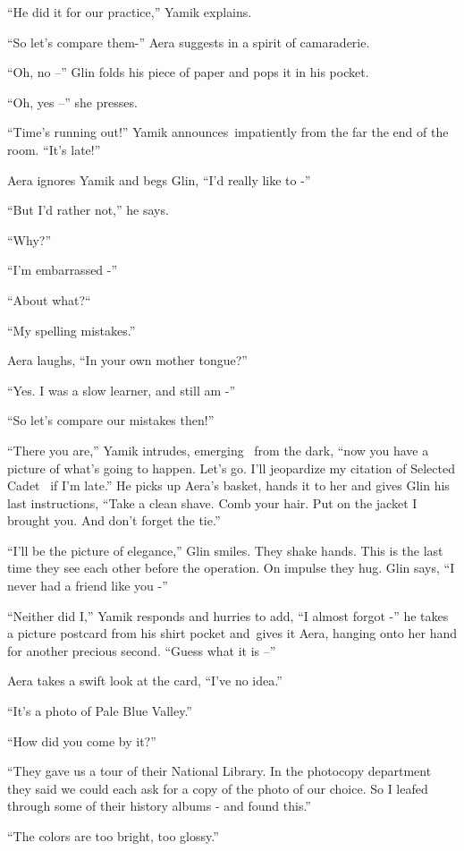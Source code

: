 \documentclass[twoside,11pt]{book}
\begin{document}
``He did it for our practice,'' Yamik explains.

``So let's compare them-'' Aera suggests in a spirit of camaraderie.

``Oh, no --'' Glin folds his piece of paper and pops it in his pocket.

``Oh, yes --'' she presses.

``Time's running out!'' Yamik announces~impatiently from the far the end of the room.
``It's late!''

Aera ignores Yamik and begs Glin, ``I'd really like to -''

``But I'd rather not,'' he says.

``Why?''

``I'm embarrassed -''

``About what?``~

``My spelling mistakes.''

Aera laughs, ``In your own mother tongue?''

``Yes. I was a slow learner, and still am -''

``So let's compare our mistakes then!''

{}``There you are,'' Yamik intrudes, emerging \ from the dark, ``now you have a picture of
what's going to happen. Let's go. I'll jeopardize my citation of Selected Cadet \ if I'm late.'' He picks
up Aera's basket, hands it to her and gives Glin his last instructions, ``Take a clean shave. Comb your
hair. Put on the jacket I brought you. And don't forget the tie.''

``I'll be the picture of elegance,'' Glin smiles. They shake hands. This is the last time they
see each other before the operation. On impulse they hug. Glin says, ``I never had a friend like you
-''

``Neither did I,'' Yamik responds and hurries to add, ``I almost forgot
-'' he takes a picture postcard from his shirt pocket and~gives it Aera, hanging onto her hand for another
precious second. ``Guess what it is --''

Aera takes a swift look at{ }the card, ``I've no idea.''

``It's a photo of Pale Blue Valley.''

``How did you come by it?''

``They gave us a tour of their National Library. In the photocopy department they said we could each ask
for a copy of the photo of our choice. So I leafed through some of their history albums - and found
this.''

``The colors are too bright, too glossy.''
\end{document}
